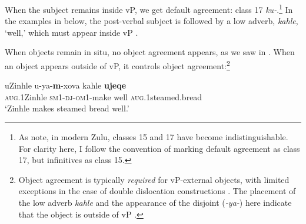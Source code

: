 \documentclass[output=paper,colorlinks,citecolor=brown]{langscibook}
\begin{document}
\ea%
    \label{ex:halpert:2}
\z 
\z 

When the subject remains inside vP, we get default agreement: class 17 \textit{ku-}.\footnote{As \citet{BuellDreu2013} note, in modern Zulu, classes 15 and 17 have become indistinguishable. For clarity here, I follow the convention of marking default agreement as class 17, but infinitives as class 15.}  In the examples in  below, the post-verbal subject is followed by a low adverb, \textit{kahle}, `well,' which must appear inside vP \citep{Buell2005}.

\ea%
    \label{ex:halpert:3}
    \z 
\z 

When objects remain in situ, no object agreement appears, as we saw in . When an object appears outside of vP, it controls object agreement:\footnote{Object agreement is typically \textit{required} for vP-external objects, with limited exceptions in the case of double dislocation constructions \cite[e.g.][]{Adams2010,Zeller2012}.  The placement of the low adverb \textit{kahle} and the appearance of the  disjoint  (\textit{-ya-}) here indicate that the object is outside of vP \citep{Buell2005,Halpert2015}.}

\ea%
    \label{ex:halpert:4}
    \gll    uZinhle u-ya-\textbf{m}-xova kahle  \textbf{ujeqe}\\
            \textsc{aug}.1Zinhle \textsc{sm}1-\textsc{dj}-\textsc{om}1-make well  \textsc{aug}.1steamed.bread\\ 
    \glt    `Zinhle makes steamed bread well.'
\z 
\end{document}
